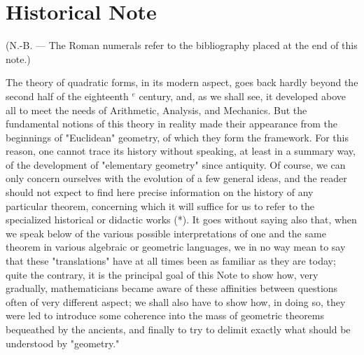 \chapter*{Historical Note}
{}

(N.-B. --- The Roman numerals refer to the bibliography placed at the end of this note.)

The theory of quadratic forms, in its modern aspect, goes back hardly beyond the second half of the eighteenth \(^{e}\) century, and, as we shall see, it developed above all to meet the needs of Arithmetic, Analysis, and Mechanics. But the fundamental notions of this theory in reality made their appearance from the beginnings of "Euclidean" geometry, of which they form the framework. For this reason, one cannot trace its history without speaking, at least in a summary way, of the development of "elementary geometry" since antiquity. Of course, we can only concern ourselves with the evolution of a few general ideas, and the reader should not expect to find here precise information on the history of any particular theorem, concerning which it will suffice for us to refer to the specialized historical or didactic works (*). It goes without saying also that, when we speak below of the various possible interpretations of one and the same theorem in various algebraic or geometric languages, we in no way mean to say that these "translations" have at all times been as familiar as they are today; quite the contrary, it is the principal goal of this Note to show how, very gradually, mathematicians became aware of these affinities between questions often of very different aspect; we shall also have to show how, in doing so, they were led to introduce some coherence into the mass of geometric theorems bequeathed by the ancients, and finally to try to delimit exactly what should be understood by "geometry."

